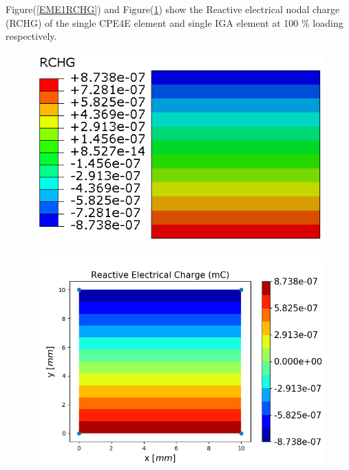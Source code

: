 \documentclass[11pt]{article}
\begin{document}
Figure(\ref{EME1RCHG}) and Figure(\ref{EME1RCHG_IGA}) show the Reactive electrical nodal charge (RCHG) of the single CPE4E element and single IGA element at 100 \% loading respectively. \\
\begin{figure}[H]
	\centering
	\begin{minipage}{.5\textwidth}
		\centering
		\includegraphics[width=1\linewidth]{EME1RCHG.png}
		\label{EME1RCHG}
	\end{minipage}%
	\begin{minipage}{.6\textwidth}
		\centering
		\includegraphics[width=1\linewidth]{EME1RCHG_IGA.png}
		\label{EME1RCHG_IGA}
	\end{minipage}
\end{figure}
\end{document}
